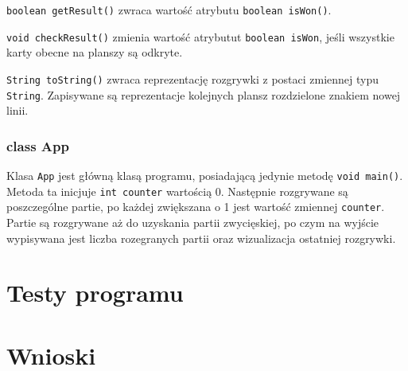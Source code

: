 \documentclass{article}
\begin{document}
\texttt{boolean getResult()} zwraca wartość atrybutu \texttt{boolean isWon()}.

\texttt{void checkResult()} zmienia wartość atrybutut \texttt{boolean isWon}, jeśli wszystkie karty obecne na planszy są odkryte.

\texttt{String toString()} zwraca reprezentację rozgrywki z postaci zmiennej typu \texttt{String}. Zapisywane są reprezentacje kolejnych plansz rozdzielone znakiem nowej linii.

\subsubsection*{class App}

Klasa \texttt{App} jest główną klasą programu, posiadającą jedynie metodę \texttt{void main()}. Metoda ta inicjuje \texttt{int counter} wartością 0. Następnie rozgrywane są poszczególne partie, po każdej zwiększana o 1 jest wartość zmiennej \texttt{counter}. Partie są rozgrywane aż do uzyskania partii zwycięskiej, po czym na wyjście wypisywana jest liczba rozegranych partii oraz wizualizacja ostatniej rozgrywki.

\section{Testy programu}
\section{Wnioski}



\end{document}
